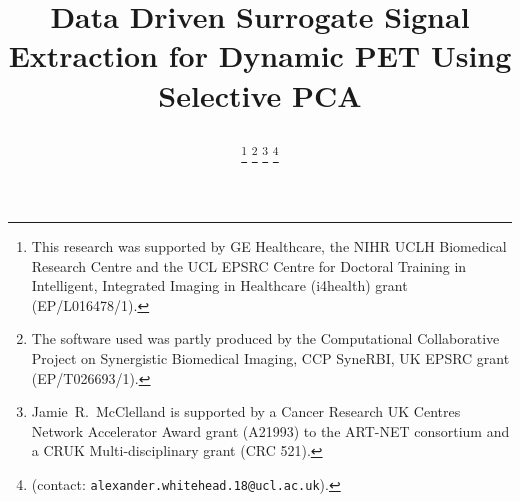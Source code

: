\documentclass[10pt, twocolumn, twoside, letterpaper]{IEEEtran}
\begin{document}
\title{

    Data Driven Surrogate Signal Extraction for Dynamic PET Using Selective PCA
}

\pagestyle{plain}

\author{
    
        

    \thanks{This research was supported by GE Healthcare, the NIHR UCLH Biomedical Research Centre and the UCL EPSRC Centre for Doctoral Training in Intelligent, Integrated Imaging in Healthcare (i4health) grant (EP/L016478/1).}
    \thanks{The software used was partly produced by the Computational Collaborative Project on Synergistic Biomedical Imaging, CCP SyneRBI, UK EPSRC grant (EP/T026693/1).}
    \thanks{Jamie~R.~McClelland is supported by a Cancer Research UK Centres Network Accelerator Award grant (A21993) to the ART-NET consortium and a CRUK Multi-disciplinary grant (CRC 521).}
    \thanks{(contact: \texttt{alexander.whitehead.18@ucl.ac.uk}).}
}
\end{document}
